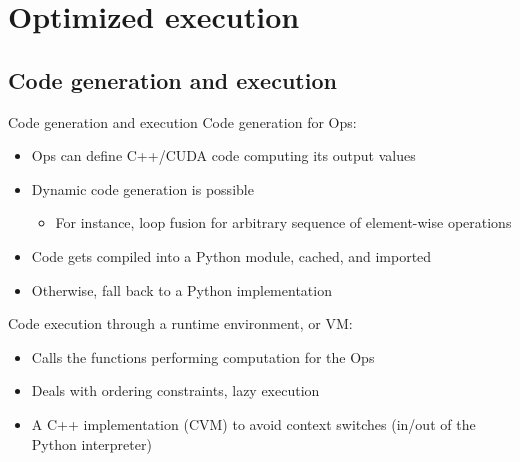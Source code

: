 \documentclass[a4paper,9pt]{beamer}
\begin{document}
\section{Optimized execution}
\begin{frame}
  \tableofcontents[currentsection]
\end{frame}

\subsection{Code generation and execution}
\begin{frame}[fragile]{Code generation and execution}
  Code generation for Ops:
  \begin{itemize}
    \item Ops can define C++/CUDA code computing its output values
    \item Dynamic code generation is possible
      \begin{itemize}
        \item For instance, loop fusion for arbitrary sequence of element-wise operations
      \end{itemize}
    \item Code gets compiled into a Python module, cached, and imported
    \item Otherwise, fall back to a Python implementation
  \end{itemize}

  Code execution through a runtime environment, or VM:
  \begin{itemize}
    \item Calls the functions performing computation for the Ops
    \item Deals with ordering constraints, lazy execution
    \item A C++ implementation (CVM) to avoid context switches
      (in/out of the Python interpreter)
  \end{itemize}
\end{frame}
\end{document}
